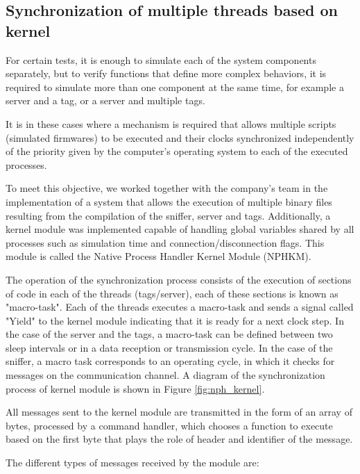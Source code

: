 \documentclass[journal]{IEEEtran}	%
\begin{document}
\subsection{Synchronization of multiple threads based on kernel}

For certain tests, it is enough to simulate each of the system components separately, but to verify functions that define more complex behaviors, it is required to simulate more than one component at the same time, for example a server and a tag, or a server and multiple tags.

It is in these cases where a mechanism is required that allows multiple scripts (simulated firmwares) to be executed and their clocks synchronized independently of the priority given by the computer's operating system to each of the executed processes.

To meet this objective, we worked together with the company's team in the implementation of a system that allows the execution of multiple binary files resulting from the compilation of the sniffer, server and tags. Additionally, a kernel module was implemented capable of handling global variables shared by all processes such as simulation time and connection/disconnection flags. This module is called the Native Process Handler Kernel Module (NPHKM).

The operation of the synchronization process consists of the execution of sections of code in each of the threads (tags/server), each of these sections is known as "macro-task". Each of the threads executes a macro-task and sends a signal called "Yield" to the kernel module indicating that it is ready for a next clock step. In the case of the server and the tags, a macro-task can be defined between two sleep intervals or in a data reception or transmission cycle. In the case of the sniffer, a macro task corresponds to an operating cycle, in which it checks for messages on the communication channel. A diagram of the synchronization process of kernel module is shown in Figure \ref{fig:nph_kernel}.

All messages sent to the kernel module are transmitted in the form of an array of bytes, processed by a command handler, which chooses a function to execute based on the first byte that plays the role of header and identifier of the message.

The different types of messages received by the module are:
\end{document}
